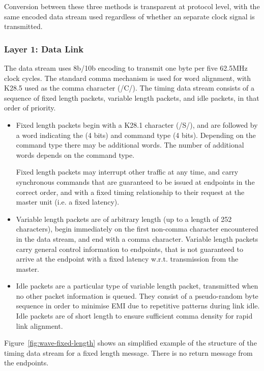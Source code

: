\documentclass{dune}
\begin{document}
Conversion between these three methods is transparent at protocol level, with the same encoded data stream used regardless of whether an separate clock signal is transmitted.

\subsubsection{Layer 1: Data Link}
\label{section:data_link}

The data stream uses 8b/10b encoding to transmit one byte per five 62.5MHz clock cycles. The standard comma mechanism is used for word alignment, with K28.5 used as the comma character (/C/). The timing data stream consists of a sequence of fixed length packets, variable length packets, and idle packets, in that order of priority.

\begin{itemize}
	\item Fixed length packets begin with a K28.1 character (/S/), and are followed by a word indicating the  (4 bits) and command type (4 bits). Depending on the command type there may be additional words. The number of additional words depends on the command type.
	 
	 Fixed length packets may interrupt other traffic at any time, and carry synchronous commands that are guaranteed to be issued at endpoints in the correct order, and with a fixed timing relationship to their request at the master unit (i.e. a fixed latency).
	\item Variable length packets are of arbitrary length (up to a length of 252 characters), begin immediately on the first non-comma character encountered in the data stream, and end with a comma character. Variable length packets carry general control information to endpoints, that is not guaranteed to arrive at the endpoint with a fixed latency w.r.t. transmission from the master.
	\item Idle packets are a particular type of variable length packet, transmitted when no other packet information is queued. They consist of a pseudo-random byte sequence in order to minimise EMI due to repetitive patterns during link idle. Idle packets are of short length to ensure sufficient comma density for rapid link alignment.
\end{itemize}

Figure~\ref{fig:wave-fixed-length} shows an simplified example of the structure of the timing data stream for a fixed length message. There is no return message from the endpoints. 
\end{document}

